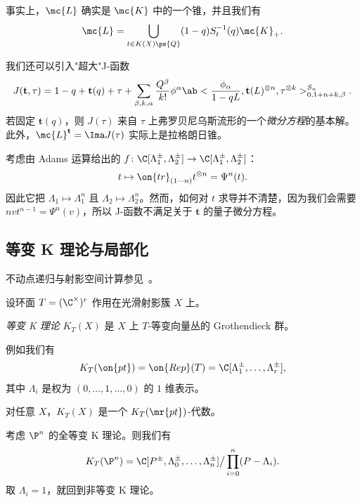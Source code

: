 \begin{prop}
    事实上，\(\mc{L}\) 确实是 \(\mc{K}\) 中的一个锥，并且我们有
    \[ \mc{L} = \bigcup_{t \in K(X)\ps{Q}} (1-q) S_{t}^{-1}(q) \mc{K}_+. \]
\end{prop}

我们还可以引入"超大"J-函数
\[ J(\mathbf{t}, \tau) = 1-q + \mathbf{t}(q) + \tau + \sum_{\beta, k, \alpha} \frac{Q^{\beta}}{k!} \phi^{\alpha} \ab< \frac{\phi_{\alpha}}{1-qL}, \mathbf{t}(L)^{\otimes n}, \tau^{\otimes k}>_{0,1+n+k,\beta}^{S_n}. \]
若固定 \(\mathbf{t}(q)\)，则 \(J(\tau)\) 来自 \(\tau\) 上弗罗贝尼乌斯流形的一个\textit{微分方程}的基本解。此外，\(\mc{L}^{\mathbf{t}}=  \Ima J(\tau)\) 实际上是拉格朗日锥。

\begin{exm}
    考虑由 Adams 运算给出的 \(f \colon \C[\Lambda_1^{\pm}, \Lambda_2^{\pm}] \to \C[\Lambda_1^{\pm}, \Lambda_2^{\pm}]\)：
    \[ t \mapsto \on{tr}_{(1\cdots n)} t^{\otimes n} = \Psi^n (t). \]
    因此它把 \(\Lambda_1 \mapsto \Lambda_1^n\) 且 \(\Lambda_2 \mapsto \Lambda_2^n\)。然而，如何对 \(t\) 求导并不清楚，因为我们会需要 \(nv t^{n-1} = \Psi^n(v)\)，所以 J-函数不满足关于 \(\mathbf{t}\) 的量子微分方程。
\end{exm}

\subsection{等变 K 理论与局部化}%
\label{sub:Equivariant K-theory and localization}

不动点递归与射影空间计算参见~\cite{GiventalK2}。

设环面 \(T = (\C^{\times})^r\) 作用在光滑射影簇 \(X\) 上。

\begin{defn}
    \textit{等变 K 理论} \(K_T(X)\) 是 \(X\) 上 \(T\)-等变向量丛的 Grothendieck 群。
\end{defn}

\begin{exm}
    例如我们有
    \[ K_T(\on{pt}) = \on{Rep}(T) = \C[\Lambda_1^{\pm}, \ldots, \Lambda_r^{\pm}], \]
    其中 \(\Lambda_i\) 是权为 \((0, \ldots, 1, \ldots, 0)\) 的 \(1\) 维表示。
\end{exm}

\begin{rmk}
    对任意 \(X\)，\(K_T(X)\) 是一个 \(K_T(\mr{pt})\)-代数。
\end{rmk}

\begin{exm}
    考虑 \(\P^n\) 的全等变 K 理论。则我们有
    \[ K_T(\P^n) = \C[P^{\pm}, \Lambda_0^{\pm}, \ldots, \Lambda_n^{\pm}] \big/ \prod_{i=0}^n (P-\Lambda_i). \]
    取 \(\Lambda_i = 1\)，就回到非等变 K 理论。
\end{exm}

